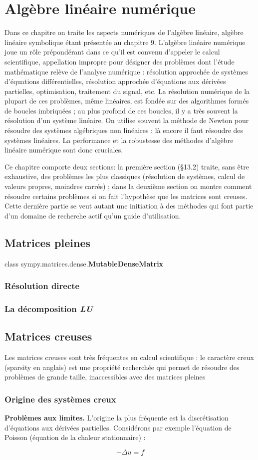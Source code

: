 \chapter{Algèbre linéaire numérique}
Dans ce chapitre on traite les aspects numériques de l'algèbre linéaire, algèbre linéaire symbolique étant présentée au chapitre 9. L'algèbre linéaire numérique joue un rôle prépondérant dans ce qu'il est convenu d'appeler le calcul scientifique, appellation impropre pour désigner des problèmes dont l'étude mathématique relève de l'analyse numérique : résolution approchée de systèmes d'équations différentielles, résolution approchée d'équations aux dérivées partielles, optimisation, traitement du signal, etc. La résolution numérique de la plupart de ces problèmes, même linéaires, est fondée sur des algorithmes formés de boucles imbriquées ; au plus profond de ces boucles, il y a très souvent la résolution d'un système linéaire. On utilise souvent
la méthode de Newton pour résoudre des systèmes algébriques non linéaires : là encore il faut résoudre des systèmes linéaires. 
La performance et la robustesse des méthodes d'algèbre linéaire numérique sont donc cruciales.


Ce chapitre comporte deux sections: la première section (§13.2) traite, sans être exhaustive, des problèmes les 
plus classiques (résolution de systèmes, calcul de valeurs propres, moindres carrés) ; dans la deuxième section on 
montre comment résoudre certains problèmes si on fait l'hypothèse que les matrices sont creuses. Cette dernière partie se veut
autant une initiation à des méthodes qui font partie d'un domaine de recherche actif qu'un guide d'utilisation.

\section{Matrices pleines}
class sympy.matrices.dense.\textbf{MutableDenseMatrix}
\subsection{Résolution directe}
\subsection{La décomposition \textit{LU}}
\section{Matrices creuses}
Les matrices creuses sont très fréquentes en calcul scientifique : le caractère creux (sparsity en anglais) est une propriété recherchée qui permet de résoudre des problèmes de grande taille, inaccessibles avec des matrices pleines
\subsection{Origine des systèmes creux}
\begin{flushright}
\textbf{Problèmes aux limites.} L'origine la plus fréquente est la discrétisation d'équations aux dérivées partielles. Considérons par exemple l'équation de Poisson (équation de la chaleur stationnaire) :
\end{flushright}
\[
-\Delta u = f
\]
